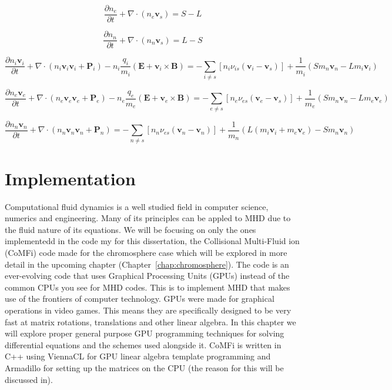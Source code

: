 \documentclass[12pt,upcase]{umlthesis}
\begin{document}
\begin{equation}\label{eq:econtinuity}
	\frac{\partial n_e}{\partial t} + \nabla \cdot (n_e \textbf{v}_s) = S - L
\end{equation}

\begin{equation}\label{eq:econtinuity}
	\frac{\partial n_n}{\partial t} + \nabla \cdot (n_n \textbf{v}_s) = L - S
\end{equation}

\begin{equation}\label{eq:imomentum}
	\frac{\partial n_i \textbf{v}_i}{\partial t} + \nabla \cdot (n_i \textbf{v}_i \textbf{v}_i + \textbf{P}_i ) - n_i \frac{q_i}{m_i}(\textbf{E} + \textbf{v}_i \times \textbf{B}) = - \sum_{i \neq s} [n_i \nu_{is}(\textbf{v}_i - \textbf{v}_s)] + \frac{1}{m_i} (S m_n \textbf{v}_n- L m_i \textbf{v}_i)
\end{equation}

\begin{equation}\label{eq:emomentum}
	\frac{\partial n_e \textbf{v}_e}{\partial t} + \nabla \cdot (n_e \textbf{v}_e \textbf{v}_e + \textbf{P}_e ) - n_e \frac{q_e}{m_e}(\textbf{E} + \textbf{v}_e \times \textbf{B}) = - \sum_{e \neq s} [n_e \nu_{es}(\textbf{v}_e - \textbf{v}_s)] + \frac{1}{m_e} (S m_n \textbf{v}_n - L m_e \textbf{v}_e)
\end{equation}

\begin{equation}\label{eq:nmomentum}
	\frac{\partial n_n \textbf{v}_n}{\partial t} + \nabla \cdot (n_n \textbf{v}_n \textbf{v}_n + \textbf{P}_n ) = - \sum_{n \neq s} [n_n \nu_{es}(\textbf{v}_n - \textbf{v}_n)] + \frac{1}{m_n} (L(m_i\textbf{v}_i+m_e\textbf{v}_e) -S m_n \textbf{v}_n)
\end{equation}

\chapter{Implementation}\label{chap:implementation}

Computational fluid dynamics is a well studied field in computer science, numerics and engineering. Many of its principles can be appled to MHD due to the fluid nature of its equations. We will be focusing on only the ones implementedd in the code my for this dissertation, the Collisional Multi-Fluid ion (CoMFi) code made for the chromosphere case which will be explored in more detail in the upcoming chapter (Chapter~\ref{chap:chromosphere}). The code is an ever-evolving code that uses Graphical Processing Units (GPUs) instead of the common CPUs you see for MHD codes. This is to implement MHD that makes use of the frontiers of computer technology. GPUs were made for graphical operations in video games. This means they are specifically designed to be very fast at matrix rotations, translations and other linear algebra. In this chapter we will explore proper general purpose GPU programming techniques for solving differential equations and the schemes used alongside it. CoMFi is written in C++ using ViennaCL for GPU linear algebra template programming and Armadillo for setting up the matrices on the CPU (the reason for this will be discussed in).
\end{document}
